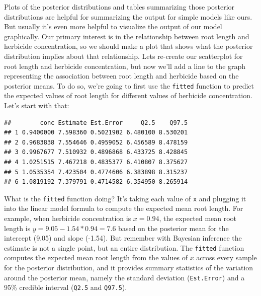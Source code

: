 \documentclass[
]{book}
\newenvironment{Shaded}{\begin{snugshade}}{\end{snugshade}}
\newcommand{\AttributeTok}[1]{\textcolor[rgb]{0.13,0.29,0.53}{#1}}
\newcommand{\CommentTok}[1]{\textcolor[rgb]{0.56,0.35,0.01}{\textit{#1}}}
\newcommand{\DecValTok}[1]{\textcolor[rgb]{0.00,0.00,0.81}{#1}}
\newcommand{\FunctionTok}[1]{\textcolor[rgb]{0.13,0.29,0.53}{\textbf{#1}}}
\newcommand{\NormalTok}[1]{#1}
\newcommand{\OtherTok}[1]{\textcolor[rgb]{0.56,0.35,0.01}{#1}}
\newcommand{\SpecialCharTok}[1]{\textcolor[rgb]{0.81,0.36,0.00}{\textbf{#1}}}
\begin{document}
Plots of the posterior distributions and tables summarizing those posterior distributions are helpful for summarizing the output for simple models like ours. But usually it's even more helpful to visualize the output of our model graphically. Our primary interest is in the relationship between root length and herbicide concentration, so we should make a plot that shows what the posterior distribution implies about that relationship. Lets re-create our scatterplot for root length and herbicide concentration, but now we'll add a line to the graph representing the association between root length and herbicide based on the posterior means. To do so, we're going to first use the \texttt{fitted} function to predict the expected values of root length for different values of herbicide concentration. Let's start with that:

\begin{Shaded}
\end{Shaded}

\begin{verbatim}
##        conc Estimate Est.Error     Q2.5    Q97.5
## 1 0.9400000 7.598360 0.5021902 6.480100 8.530201
## 2 0.9683838 7.554646 0.4959052 6.456589 8.478159
## 3 0.9967677 7.510932 0.4896868 6.433725 8.428845
## 4 1.0251515 7.467218 0.4835377 6.410807 8.375627
## 5 1.0535354 7.423504 0.4774606 6.383898 8.315237
## 6 1.0819192 7.379791 0.4714582 6.354950 8.265914
\end{verbatim}

What is the \texttt{fitted} function doing? It's taking each value of \texttt{x} and plugging it into the linear model formula to compute the expected mean root length. For example, when herbicide concentration is \(x = 0.94\), the expected mean root length is \(y = 9.05 - 1.54*0.94 = 7.6\) based on the posterior mean for the intercept (9.05) and slope (-1.54). But remember with Bayesian inference the estimate is not a single point, but an entire distribution. The \texttt{fitted} function computes the expected mean root length from the values of \(x\) across every sample for the posterior distribution, and it provides summary statistics of the variation around the posterior mean, namely the standard deviation (\texttt{Est.Error}) and a 95\% credible interval (\texttt{Q2.5} and \texttt{Q97.5}).
\end{document}
